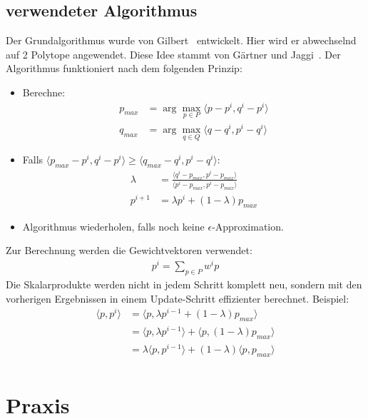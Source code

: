 \documentclass[ngerman]{scrartcl}
\begin{document}
\subsection{verwendeter Algorithmus}
Der Grundalgorithmus wurde von Gilbert~\cite{eggilbert} entwickelt. 
Hier wird er abwechselnd auf 2 Polytope angewendet. 
Diese Idee stammt von Gärtner und Jaggi~\cite{jaggi}.
Der Algorithmus funktioniert nach dem folgenden Prinzip:
\begin{itemize}
\item Berechne:
\begin{align}
p_{max} &=\arg\max_{p \in P} \langle p - p^i, q^i - p^i \rangle \\
q_{max} &=\arg\max_{q \in Q} \langle q - q^i, p^i - q^i \rangle
\end{align}
\item Falls $ \langle p_{max} - p^i, q^i - p^i \rangle \geq \langle q_{max} - q^i, p^i - q^i \rangle$:
\begin{align}
\lambda&= \frac{\langle q^i-p_{max},p^i-p_{max}\rangle}{\langle p^i-p_{max},p^i-p_{max}\rangle}\\  
p^{i+1} &= \lambda p^i + (1 - \lambda) p_{max}
\end{align}
\item Algorithmus wiederholen, falls noch keine $\epsilon$-Approximation.
\end{itemize}
Zur Berechnung werden die Gewichtvektoren verwendet:
\begin{align}
p^i = \sum_{p \in P} w^i p
\end{align}
Die Skalarprodukte werden nicht in jedem Schritt komplett neu, sondern mit den vorherigen Ergebnissen in einem Update-Schritt effizienter berechnet.
Beispiel:
\begin{align}
\langle p , p^i \rangle &= \langle p , \lambda p^{i-1} + (1-\lambda) p_{max} \rangle \\
&= \langle p, \lambda p^{i-1} \rangle + \langle p, (1-\lambda) p_{max} \rangle \\
&= \lambda \langle p, p^{i-1} \rangle + (1-\lambda) \langle p, p_{max} \rangle \\
\end{align}

\section{Praxis}
\end{document}
